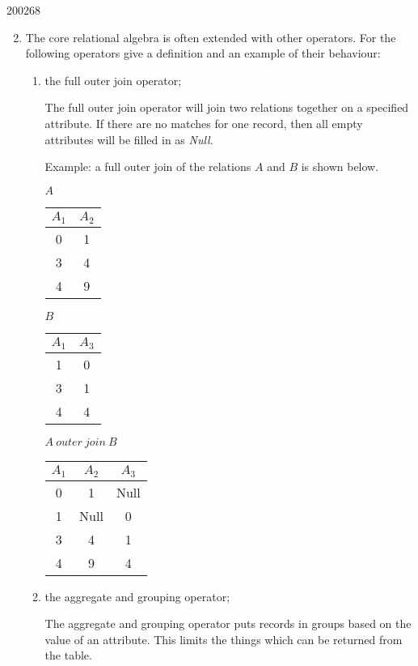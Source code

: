 \documentclass[10pt,\jkfside,a4paper]{article}
\begin{document}
\begin{examquestion}{2002}{6}{8}
\begin{enumerate}
\setcounter{enumi}{1}
\item{The core relational algebra is often extended with other operators. For the
following operators give a definition and an example of their behaviour:}
\begin{enumerate}
\item{the full outer join operator;}

The full outer join operator will join two relations together on a specified attribute. If there are no matches for one record, then all empty attributes will be filled in as \textit{Null}.

Example: a full outer join of the relations $A$ and $B$ is shown below.

\begin{center}
$A$
\begin{tabular}{|c|c|}
\hline
$A_1$ & $A_2$\\
\hline
0 & 1\\
3 & 4\\
4 & 9\\
\hline
\end{tabular}
\end{center}

\begin{center}
$B$
\begin{tabular}{|c|c|}
\hline
$A_1$ & $A_3$\\
\hline
1 & 0\\
3 & 1\\
4 & 4\\
\hline
\end{tabular}
\end{center}

\begin{center}
$A\ outer\ join\ B$
\begin{tabular}{|c|c|c|}
\hline
$A_1$ & $A_2$ & $A_3$\\
\hline
0 & 1 & Null\\
1 & Null & 0\\
3 & 4 & 1\\
4 & 9 & 4\\
\hline
\end{tabular}
\end{center}

\item{the aggregate and grouping operator;}

The aggregate and grouping operator puts records in groups based on the value of an attribute. 
This limits the things which can be returned from the table.


\end{enumerate}
\end{enumerate}
\end{examquestion}
\end{document}
